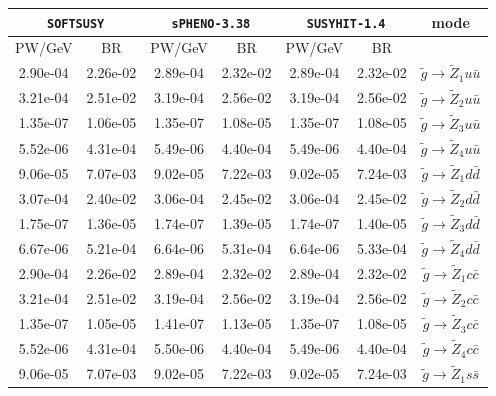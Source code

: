 \documentclass[final,3p,times]{elsarticle}
\begin{document}
\begin{center}
\begin{table}
\centering
\begin{tabular}{|c|c|c|c|c|c|c|} \hline
\multicolumn{2}{|C{3.0cm}|}{{\tt SOFTSUSY}} & \multicolumn{2}{C{3.0cm}|}{{\tt sPHENO-3.38}} & \multicolumn{2}{C{3.0cm}|}{{\tt SUSYHIT-1.4}} & mode \\ \hline
PW/GeV & BR & PW/GeV & BR & PW/GeV & BR & \\ \hline
2.90e-04 & 2.26e-02 & 2.89e-04 & 2.32e-02 & 2.89e-04 & 2.32e-02 & $\tilde{g} \rightarrow \tilde{Z}_1 u \bar{u}$ \\ \hline
3.21e-04 & 2.51e-02 & 3.19e-04 & 2.56e-02 & 3.19e-04 & 2.56e-02 & $\tilde{g} \rightarrow \tilde{Z}_2 u \bar{u}$ \\ \hline
1.35e-07 & 1.06e-05 & 1.35e-07 & 1.08e-05 & 1.35e-07 & 1.08e-05 & $\tilde{g} \rightarrow \tilde{Z}_3 u \bar{u}$ \\ \hline
5.52e-06 & 4.31e-04 & 5.49e-06 & 4.40e-04 & 5.49e-06 & 4.40e-04 & $\tilde{g} \rightarrow \tilde{Z}_4 u \bar{u}$ \\ \hline
9.06e-05 & 7.07e-03 & 9.02e-05 & 7.22e-03 & 9.02e-05 & 7.24e-03 & $\tilde{g} \rightarrow \tilde{Z}_1 d \bar{d}$ \\ \hline
3.07e-04 & 2.40e-02 & 3.06e-04 & 2.45e-02 & 3.06e-04 & 2.45e-02 &  $\tilde{g} \rightarrow \tilde{Z}_2 d \bar{d}$ \\ \hline
1.75e-07 & 1.36e-05 & 1.74e-07 & 1.39e-05 & 1.74e-07 & 1.40e-05 & $\tilde{g} \rightarrow \tilde{Z}_3 d \bar{d}$ \\ \hline
6.67e-06 & 5.21e-04 & 6.64e-06 & 5.31e-04 & 6.64e-06 & 5.33e-04 & $\tilde{g} \rightarrow \tilde{Z}_4 d \bar{d}$ \\ \hline
2.90e-04 & 2.26e-02 & 2.89e-04 & 2.32e-02 & 2.89e-04 & 2.32e-02 & $\tilde{g} \rightarrow \tilde{Z}_1 c \bar{c}$ \\ \hline
3.21e-04 & 2.51e-02 & 3.19e-04 & 2.56e-02 & 3.19e-04 & 2.56e-02 & $\tilde{g} \rightarrow \tilde{Z}_2 c \bar{c}$ \\ \hline
1.35e-07 & 1.05e-05 & 1.41e-07 & 1.13e-05 & 1.35e-07 & 1.08e-05 & $\tilde{g} \rightarrow \tilde{Z}_3 c \bar{c}$ \\ \hline
5.52e-06 & 4.31e-04 & 5.50e-06 & 4.40e-04 & 5.49e-06 & 4.40e-04  & $\tilde{g} \rightarrow \tilde{Z}_4 c \bar{c}$ \\ \hline
9.06e-05 & 7.07e-03 & 9.02e-05 & 7.22e-03 & 9.02e-05 & 7.24e-03  & $\tilde{g} \rightarrow \tilde{Z}_1 s \bar{s}$ \\ \hline

\end{tabular}
\end{table}
\end{center}
\end{document}
